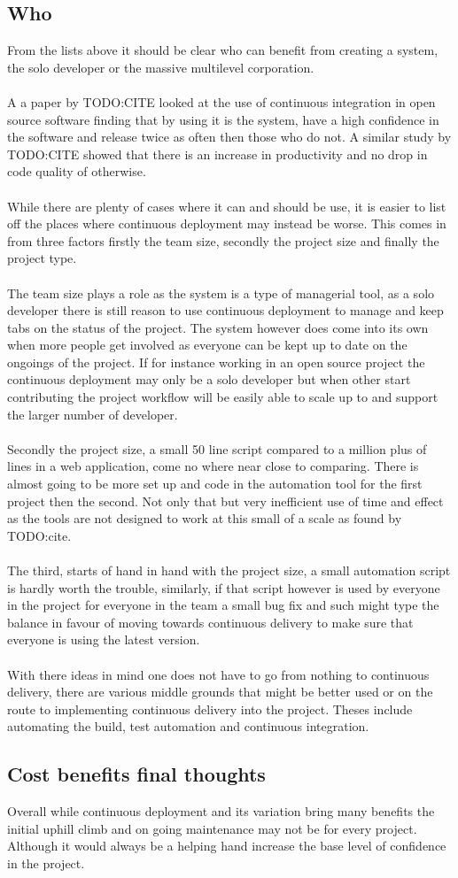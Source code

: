 \subsection{Who}

From the lists above it should be clear who can benefit from creating a system, the solo developer or the massive multilevel corporation.
\\\\
A a paper by TODO:CITE looked at the use of continuous integration in open source software finding that by using it is the system, have a high confidence in the software and release twice as often then those who do not. A similar study by TODO:CITE showed that there is an increase in productivity and no drop in code quality of otherwise.
\\\\
While there are plenty of cases where it can and should be use, it is easier to list off the places where continuous deployment may instead be worse. This comes in from three factors firstly the team size, secondly the project size and finally the project type.
\\\\
The team size plays a role as the system is a type of managerial tool, as a solo developer there is still reason to use continuous deployment to manage and keep tabs on the status of the project. The system however does come into its own when more people get involved as everyone can be kept up to date on the ongoings of the project. If for instance working in an open source project the continuous deployment may only be a solo developer but when other start contributing the project workflow will be easily able to scale up to and support the larger number of developer.
\\\\
Secondly the project size, a small 50 line script compared to a million plus of lines in a web application, come no where near close to comparing. There is almost going to be more set up and code in the automation tool for the first project then the second. Not only that but very inefficient use of time and effect as the tools are not designed to work at this small of a scale as found by TODO:cite.
\\\\
The third, starts of hand in hand with the project size, a small automation script is hardly worth the trouble, similarly, if that script however is used by everyone in the project for everyone in the team a small bug fix and such might type the balance in favour of moving towards continuous delivery to make sure that everyone is using the latest version. 
\\\\
With there ideas in mind one does not have to go from nothing to continuous delivery, there are various middle grounds that might be better used or on the route to implementing continuous delivery into the project. Theses include automating the build, test automation and continuous integration. 

\subsection{Cost benefits final thoughts}

Overall while continuous deployment and its variation bring many benefits the initial uphill climb and on going maintenance may not be for every project. Although it would always be a helping hand increase the base level of confidence in the project.
